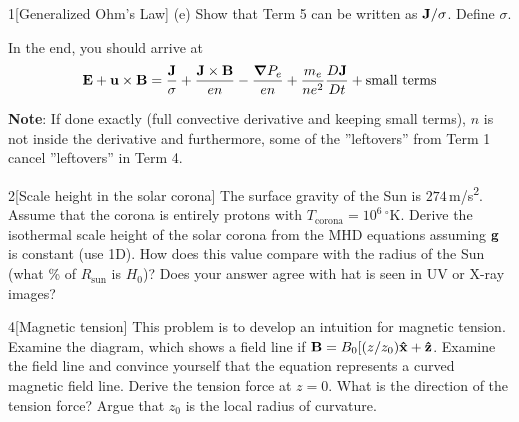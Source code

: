 \documentclass[12pt]{article}
\begin{document}
\begin{problem}{1}[Generalized Ohm's Law]
(e) Show that Term 5 can be written as $\vb{J}/\sigma$. Define $\sigma$.

In the end, you should arrive at
\begin{equation}
    \vb{E}+\vb{u}\times\vb{B}=\frac{\vb{J}}{\sigma}+\frac{\vb{J}\times\vb{B}}{en}-\frac{\grad
    P_e}{en}+\frac{m_e}{ne^2}\frac{D\vb{J}}{Dt}+\text{small terms} 
\end{equation}

\textbf{Note}: If done exactly (full convective derivative and keeping small
terms), $n$ is not inside the derivative and furthermore, some of the
''leftovers'' from Term 1 cancel ''leftovers'' in Term 4.
\begin{solution}
\end{solution}
\end{problem}
\begin{problem}{2}[Scale height in the solar corona]
The surface gravity of the Sun is $274$\,\si{m/s\tothe{2}}. Assume that the
corona is entirely protons with $T_{\text{corona}}=10^6$\,$^\circ$\si{K}.
Derive the isothermal scale height of the solar corona from the MHD equations
assuming $\vb{g}$ is constant (use 1D). How does this value compare with the
radius of the Sun (what \% of $R_{\text{sun}}$ is $H_0$)? Does your answer agree
with hat is seen in UV or X-ray images?
\begin{solution}
\end{solution}
\end{problem}

\begin{problem}{4}[Magnetic tension]
This problem is to develop an intuition for magnetic tension. Examine the
diagram, which shows a field line if $\vb{B}=B_0[(z /z_0)\vb{\hat{x}}+\vb{\hat{z}}$. Examine
the field line and convince yourself that the equation represents a curved
magnetic field line. Derive the tension force at $z=0$. What is the direction of
the tension force? Argue that $z_0$ is the local radius of curvature.
\begin{solution}
\end{solution}
\end{problem}
\end{document}
